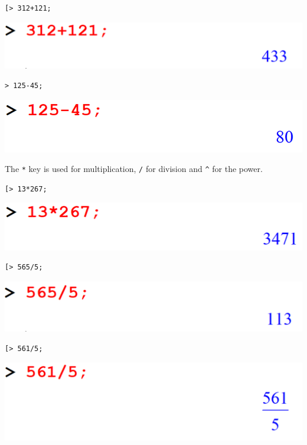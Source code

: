 \documentclass[
]{book}
\theoremstyle{definition}
\theoremstyle{definition}
\theoremstyle{definition}
\theoremstyle{definition}
\theoremstyle{remark}
\begin{document}
\begin{verbatim}
[> 312+121;
\end{verbatim}

\includegraphics{figures/Lesson 1/fig4.png}

\begin{verbatim}
> 125-45;
\end{verbatim}

\includegraphics{figures/Lesson 1/fig5.png}

The \texttt{*} key is used for multiplication, \texttt{/} for division and \texttt{\^{}} for the power.

\begin{verbatim}
[> 13*267;
\end{verbatim}

\includegraphics{figures/Lesson 1/fig6.png}

\begin{verbatim}
[> 565/5;
\end{verbatim}

\includegraphics{figures/Lesson 1/fig7.png}

\begin{verbatim}
[> 561/5;
\end{verbatim}

\includegraphics{figures/Lesson 1/fig8.png}
\end{document}
